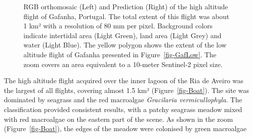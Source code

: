 \documentclass[
  number]{elsarticle}
\begin{document}
\label{cell-fig-GafHigh}
\begin{figure}[H]


\caption{\label{fig-GafHigh}RGB orthomosaic (Left) and Prediction
(Right) of the high altitude flight of Gafanha, Portugal. The total
extent of this flight was about 1 km² with a resolution of 80 mm per
pixel. Background colors indicate intertidal area (Light Green), land
area (Light Grey) and water (Light Blue). The yellow polygon shows the
extent of the low altitude flight of Gafanha presented in
Figure~\ref{fig-GafLow}. The zoom covers an area equivalent to a
10-meter Sentinel-2 pixel size.}

\end{figure}%

The high altitude flight acquired over the inner lagoon of the Ria de
Aveiro was the largest of all flights, covering almost 1.5 km²
(Figure~\ref{fig-Boat}). The site was dominated by seagrass and the red
macroalgae \emph{Gracilaria vermicullophyla}. The classification
provided consistent results, with a patchy seagrass meadow mixed with
red macroalgae on the eastern part of the scene. As shown in the zoom
(Figure~\ref{fig-Boat}), the edges of the meadow were colonised by green
macroalgae
\end{document}
